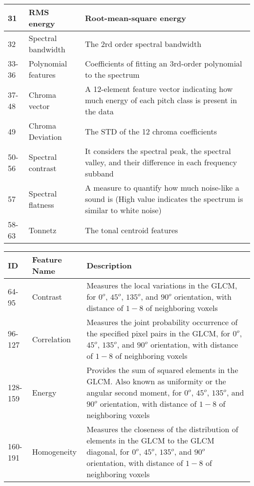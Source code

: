{\begin{center}
\begin{tabular}{|l|p{35mm}|p{110mm}|}
      \hline    
 	  31 & RMS energy & Root-mean-square energy \\      
      \hline
      32 & Spectral bandwidth & The 2rd order spectral bandwidth \\
      \hline
 	  33-36 & Polynomial features & Coefficients of fitting an 3rd-order polynomial to the spectrum \\      
      \hline
      37-48 & Chroma vector & A 12-element feature vector indicating how much energy of each pitch class is present in the data \\     
      \hline 
      49 & Chroma Deviation & The STD of the 12 chroma coefficients \\
      \hline
      50-56 & Spectral contrast & It considers the spectral peak, the spectral valley, and their difference in each frequency subband \\
      \hline
      57 & Spectral flatness & A measure to quantify how much noise-like a sound is (High value indicates the spectrum is similar to white noise) \\      
      \hline
      58-63 & Tonnetz & The tonal centroid features \\
      \hline
    \end{tabular}
  \end{center}
}

{
  \scriptsize
  \begin{center}
    \label{tab:table2}
    \begin{tabular}{|l|l|p{110mm}|}  
      \hline
      \textbf{ID} & \textbf{Feature Name} & \textbf{Description}\\
      \hline
      \hline
      64-95 & Contrast & Measures the local variations in the GLCM, for $0^o$, $45^o$, $135^o$, and $90^o$ orientation, with distance of $1-8$ of neighboring voxels \\
      \hline
      96-127 & Correlation & Measures the joint probability occurrence of the specified pixel pairs in the GLCM, for $0^o$, $45^o$, $135^o$, and $90^o$ orientation, with distance of $1-8$ of neighboring voxels \\
      \hline   
      128-159 & Energy & Provides the sum of squared elements in the GLCM. Also known as uniformity or the angular second moment, for $0^o$, $45^o$, $135^o$, and $90^o$ orientation, with distance of $1-8$ of neighboring voxels \\
      \hline       
      160-191 & Homogeneity & Measures the closeness of the distribution of elements in the GLCM to the GLCM diagonal, for $0^o$, $45^o$, $135^o$, and $90^o$ orientation, with distance of $1-8$ of neighboring voxels \\
      \hline    
    \end{tabular}
  \end{center}
}

